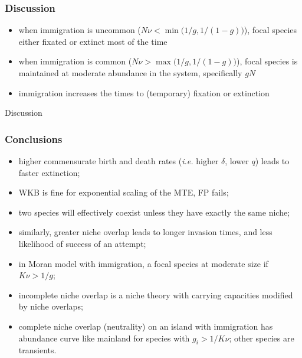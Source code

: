 \documentclass[dvipsnames]{beamer}
\begin{document}
\begin{frame}
\frametitle{Discussion}
\begin{itemize}
\item when immigration is uncommon ($N\nu < \min\big(1/g,1/(1-g)\big)$), focal species either fixated or extinct most of the time
\item when immigration is common ($N\nu > \max\big(1/g,1/(1-g)\big)$), focal species is maintained at moderate abundance in the system, specifically $gN$%
\item immigration increases the times to (temporary) fixation or extinction%
\end{itemize}
\end{frame}


\begin{frame}
\centering
{{\Huge Discussion}}
\end{frame}


\begin{frame}
\frametitle{Conclusions}
\begin{itemize}
	\item higher commensurate birth and death rates (\emph{i.e.} higher $\delta$, lower $q$) leads to faster extinction; 
	\pause
	\item WKB is fine for exponential scaling of the MTE, FP fails; 
	\pause
	\item two species will effectively coexist unless they have exactly the same niche; 
	\item similarly, greater niche overlap leads to longer invasion times, and less likelihood of success of an attempt; 
	\pause
	\item in Moran model with immigration, a focal species at moderate size if $K\nu > 1/g$; 
	\pause
	\item incomplete niche overlap is a niche theory with carrying capacities modified by niche overlaps;
	\item complete niche overlap (neutrality) on an island with immigration has abundance curve like mainland for species with $g_i>1/K\nu$; other species are transients. 
\end{itemize}
\end{frame}
\end{document}
